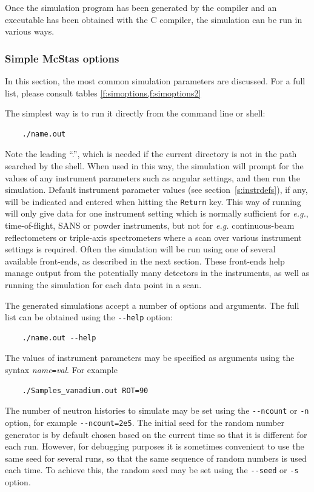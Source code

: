Once the simulation program has been generated by the \MCS compiler
and an executable has been obtained with the C compiler, the simulation
can be run in various ways.

\subsubsection{Simple McStas options}
In this section, the most common simulation parameters are
discussed. For a full list, please consult tables
\ref{f:simoptions,f:simoptions2}

The simplest way is to run it directly from the
command line or shell:
\begin{lstlisting}
    ./name.out
\end{lstlisting}
Note the leading ``.'', which is needed if the current directory is not in the
path searched by the shell. When used in this way, the simulation will prompt
for the values of any instrument parameters such as angular settings, and then
run the simulation. Default instrument parameter values (see
section~\ref{s:instrdefs}), if any, will be indicated and entered when hitting
the \verb+Return+ key. This way of
running \MCS will only give data for one instrument setting which is normally
sufficient for {\em e.g.}, time-of-flight, SANS or powder instruments, but not
for {\em e.g.} continuous-beam reflectometers or triple-axis spectrometers where
a scan over various instrument settings is required.  Often the simulation will
be run using one of several available front-ends, as described in the next
section. These front-ends help manage output from the potentially many detectors
in the instruments, as well as running the simulation for each data point in a
scan.

The generated simulations accept a number of options and arguments. The
full list can be obtained using the \verb+--help+ option:
\begin{lstlisting}
    ./name.out --help
\end{lstlisting}
The values of instrument parameters may be specified as arguments using
the syntax \textit{name}\verb+=+\textit{val}. For example
\begin{lstlisting}
    ./Samples_vanadium.out ROT=90
\end{lstlisting}
The number of neutron histories to simulate may be set using the
\verb+--ncount+ or \verb+-n+ option, for example
\verb+--ncount=2e5+. The initial seed for the random number generator is
by default chosen based on the current time so that it is different for
each run. However, for debugging purposes it is sometimes convenient to
use the same seed for several runs, so that the same sequence of random
numbers is used each time. To achieve this, the random seed may be set
using the \verb+--seed+ or \verb+-s+ option.

